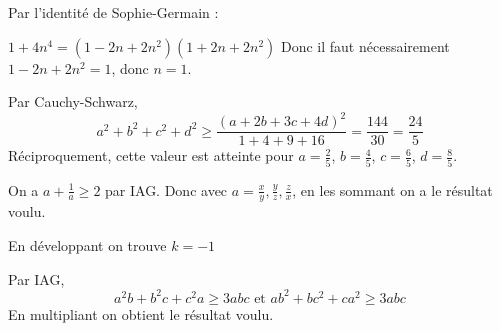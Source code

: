 \begin{sol}
Par l'identité de Sophie-Germain :

$1+4n^4=(1-2n+2n^2)(1+2n+2n^2)$
Donc il faut nécessairement $1-2n+2n^2=1$, donc $n=1$.
\end{sol}


\begin{sol}
Par Cauchy-Schwarz,
$$a^2+b^2+c^2+d^2\ge \frac{(a+2b+3c+4d)^2}{1+4+9+16}=\frac{144}{30}=\frac{24}5$$
Réciproquement, cette valeur est atteinte pour $a = \frac 25$, $b = \frac 45$, $c = \frac 65$, $d = \frac 85$.
\end{sol}


\begin{sol}
On a $a + \frac 1a \ge 2$ par IAG. Donc avec $a = \frac xy,\frac yz,\frac zx$, en les sommant on a le résultat voulu.
\end{sol}


\begin{sol}
En développant on trouve $k=-1$
\end{sol}


\begin{sol}
Par IAG,
$$a^2b+b^2c+c^2a\ge 3abc \text{ et } ab^2+bc^2+ca^2\ge 3abc$$
En multipliant on obtient le résultat voulu.
\end{sol}
